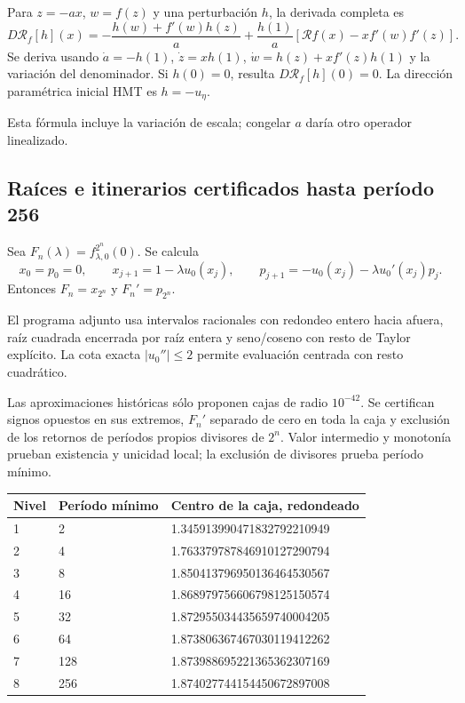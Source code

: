 Para \(z=-ax\), \(w=f(z)\) y una perturbación \(h\), la derivada completa es
\[
\boxed{
D\mathcal R_f[h](x)=
-\frac{h(w)+f'(w)h(z)}a+
\frac{h(1)}a
\left[\mathcal Rf(x)-xf'(w)f'(z)\right].
}
\]
Se deriva usando \(\dot a=-h(1)\), \(\dot z=xh(1)\),
\(\dot w=h(z)+xf'(z)h(1)\) y la variación del denominador. Si \(h(0)=0\), resulta \(D\mathcal R_f[h](0)=0\). La dirección paramétrica inicial HMT es \(h=-u_\eta\).

Esta fórmula incluye la variación de escala; congelar \(a\) daría otro operador linealizado.


\subsection{Raíces e itinerarios certificados hasta período 256}
\label{hmtfg:desarrollo:7}

Sea \(F_n(\lambda)=f_{\lambda,0}^{2^n}(0)\). Se calcula
\[
x_0=p_0=0,\qquad x_{j+1}=1-\lambda u_0(x_j),\qquad
p_{j+1}=-u_0(x_j)-\lambda u_0'(x_j)p_j.
\]
Entonces \(F_n=x_{2^n}\) y \(F_n'=p_{2^n}\).

El programa adjunto usa intervalos racionales con redondeo entero hacia afuera, raíz cuadrada encerrada por raíz entera y seno/coseno con resto de Taylor explícito. La cota exacta \(|u_0''|\le2\) permite evaluación centrada con resto cuadrático.

Las aproximaciones históricas sólo proponen cajas de radio \(10^{-42}\). Se certifican signos opuestos en sus extremos, \(F_n'\) separado de cero en toda la caja y exclusión de los retornos de períodos propios divisores de \(2^n\). Valor intermedio y monotonía prueban existencia y unicidad local; la exclusión de divisores prueba período mínimo.

\begingroup\small
\begin{longtable}{p{.12\linewidth}p{.17\linewidth}p{.62\linewidth}}
\hline
Nivel & Período mínimo & Centro de la caja, redondeado \\
\hline
1 & 2 & 1.345913990471832792210949 \\
2 & 4 & 1.763379787846910127290794 \\
3 & 8 & 1.850413796950136464530567 \\
4 & 16 & 1.868979756606798125150574 \\
5 & 32 & 1.872955034435659740004205 \\
6 & 64 & 1.873806367467030119412262 \\
7 & 128 & 1.873988695221365362307169 \\
8 & 256 & 1.874027744154450672897008 \\
\hline\end{longtable}
\endgroup

